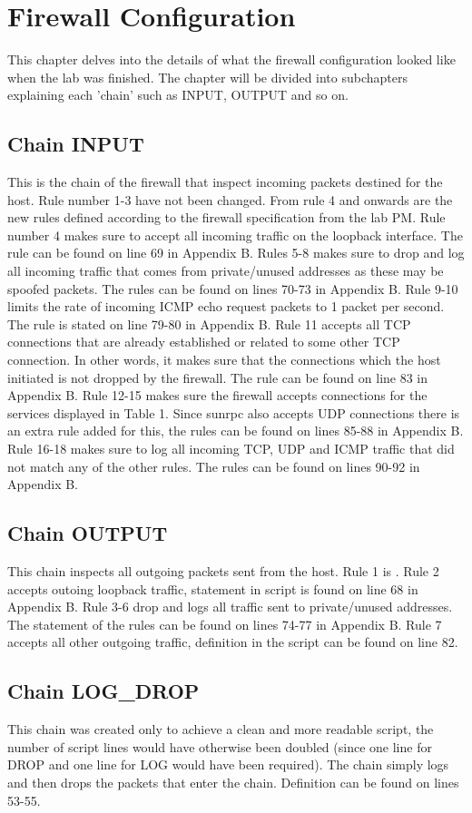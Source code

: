\section{Firewall Configuration}
\label{sec:config}
This chapter delves into the details of what the firewall configuration looked like when the lab was finished. The chapter will be divided into subchapters explaining each 'chain' such as INPUT, OUTPUT and so on.

\subsection{Chain INPUT}
This is the chain of the firewall that inspect incoming packets destined for the host. Rule number 1-3 have not been changed. From rule 4 and onwards are the new rules defined according to the firewall specification from the lab PM. Rule number 4 makes sure to accept all incoming traffic on the loopback interface. The rule can be found on line 69 in Appendix B. Rules 5-8 makes sure to drop and log all incoming traffic that comes from private/unused addresses as these may be spoofed packets. The rules can be found on lines 70-73 in Appendix B. Rule 9-10 limits the rate of incoming ICMP echo request packets to 1 packet per second. The rule is stated on line 79-80 in Appendix B. Rule 11 accepts all TCP connections that are already established or related to some other TCP connection. In other words, it makes sure that the connections which the host initiated is not dropped by the firewall. The rule can be found on line 83 in Appendix B. Rule 12-15 makes sure the firewall accepts connections for the services displayed in Table 1. Since sunrpc also accepts UDP connections there is an extra rule added for this, the rules can be found on lines 85-88 in Appendix B. Rule 16-18 makes sure to log all incoming TCP, UDP and ICMP traffic that did not match any of the other rules. The rules can be found on lines 90-92 in Appendix B.

\subsection{Chain OUTPUT}
This chain inspects all outgoing packets sent from the host. Rule 1 is . Rule 2 accepts outoing loopback traffic, statement in script is found on line 68 in Appendix B. Rule 3-6 drop and logs all traffic sent to private/unused addresses. The statement of the rules can be found on lines 74-77 in Appendix B. Rule 7 accepts all other outgoing traffic, definition in the script can be found on line 82.

\subsection{Chain LOG\_DROP}
This chain was created only to achieve a clean and more readable script, the number of script lines would have otherwise been doubled (since one line for DROP and one line for LOG would have been required). The chain simply logs and then drops the packets that enter the chain. Definition can be found on lines 53-55.


